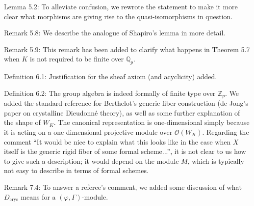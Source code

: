 \documentclass[12pt]{amsart}
\begin{document}
Lemma 5.2: To alleviate confusion, we rewrote the statement to make it more clear what morphisms are giving rise to the quasi-isomorphisms in question.

Remark 5.8: We describe the analogue of Shapiro's lemma in more detail.

Remark 5.9: This remark has been added to clarify what happens in Theorem 5.7 when $K$ is not required to be finite over $\mathbb{Q}_p$.

Definition 6.1: Justification for the sheaf axiom (and acyclicity) added.

Definition 6.2: The group algebra is indeed formally of finite type over $\mathbb{Z}_p$. We added the standard reference for Berthelot's generic fiber construction (de Jong's paper on crystalline Dieudonn\'e theory), as well as some further explanation of the shape of $W_K$. The canonical representation is one-dimensional simply because it is acting on a one-dimensional projective module over $\mathcal{O}(W_K)$. Regarding the comment ``It would be nice to explain what this looks like in the case when $X$ itself is the generic rigid fiber of some formal scheme...'', it is not clear to us how to give such a description; it would depend on the module $M$, which is typically not easy to describe in terms of formal schemes.

Remark 7.4: To answer a referee's comment, we added some discussion of what $D_{\mathrm{crys}}$ means for a $(\varphi, \Gamma)$-module.
\end{document}
